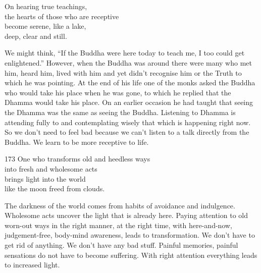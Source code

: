 
\begin{dhpVerse}{82}
\label{dhp-82}
On hearing true teachings,\\
the hearts of those who are receptive\\
become serene, like a lake,\\
deep, clear and still.
\end{dhpVerse}

\begin{dhpRefl}

We might think, ``If the Buddha were here today to teach me, I too
could get enlightened.'' However, when the Buddha was around there were
many who met him, heard him, lived with him and yet didn't recognise
him or the Truth to which he was pointing. At the end of his life one
of the monks asked the Buddha who would take his place when he was
gone, to which he replied that the Dhamma would take his place. On an
earlier occasion he had taught that seeing the Dhamma was the same as
seeing the Buddha. Listening to Dhamma is attending fully to and
contemplating wisely that which is happening right now. So we don't
need to feel bad because we can't listen to a talk directly from the
Buddha. We learn to be more receptive to life.

\end{dhpRefl}


\begin{dhpVerse}{173}
\label{dhp-173}
One who transforms old and heedless ways\\
into fresh and wholesome acts\\
brings light into the world\\
like the moon freed from clouds.
\end{dhpVerse}

\begin{dhpRefl}

The darkness of the world comes from habits of avoidance and
indulgence. Wholesome acts uncover the light that is already here.
Paying attention to old worn-out ways in the right manner, at the
right time, with here-and-now, judgement-free, body-mind awareness,
leads to transformation. We don't have to get rid of anything. We
don't have any bad stuff. Painful memories, painful sensations do not
have to become suffering. With right attention everything leads to
increased light.

\end{dhpRefl}

